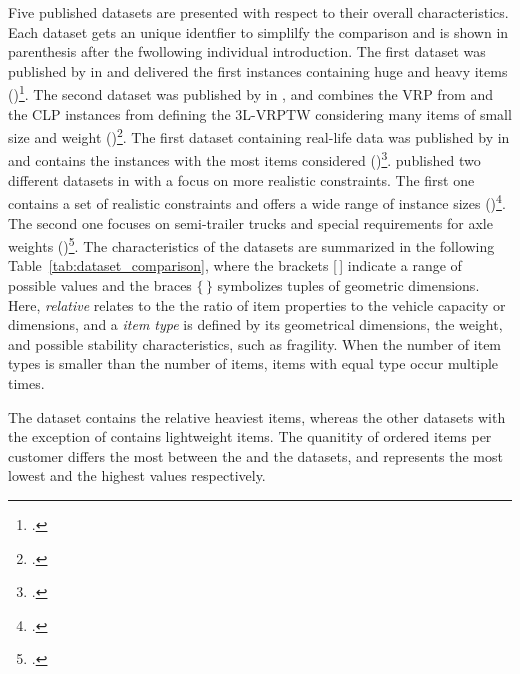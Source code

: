 Five published  datasets are presented with respect to their overall characteristics.
Each dataset gets an unique identfier to simplilfy the comparison and is shown in parenthesis
after the fwollowing individual introduction. The first  dataset was published by \citeauthor*{gendreau_tabu_2006} in
\citeyear{gendreau_tabu_2006} and delivered the first  instances containing huge and heavy items (\gendreauDataSet)\footcite[cf.][]{gendreau_tabu_2006}.
The second dataset was published by \citeauthor*{moura_integrated_2009} in \citeyear{moura_integrated_2009},
and combines the \gls{VRP} from \citeauthor*{solomon_algorithms_1987} and the \gls{CLP} instances from
\citeauthor*{bischoff_issues_1995} defining the \gls{3L-VRPTW} considering
many items of small size and weight (\mouraDataSet)\footcites[cf.][]{solomon_algorithms_1987,bischoff_issues_1995}[][]{moura_integrated_2009}.
The first dataset containing real-life data was published by \citeauthor*{ceschia_local_2013} in \citeyear{ceschia_local_2013}
and contains the instances with the most items considered (\ceschiaDataSet)\footcite[cf.][]{ceschia_local_2013}.
\citeauthor*{krebs_advanced_2021} published two different datasets in
\citeyear{krebs_advanced_2021} with a focus on more realistic constraints. The first one contains a set
of realistic constraints and offers a wide range of instance sizes (\krebsADataSet)\footcite[cf.][]{krebs_advanced_2021}.
The second one focuses on semi-trailer trucks and special requirements for axle weights (\krebsBDataSet)\footcite[cf.][]{krebs_axle_2021}.
The characteristics of the datasets are summarized in the following Table~\ref{tab:dataset_comparison},
where the brackets [\,] indicate a range of possible values and the braces $\{\,\}$ symbolizes tuples of geometric dimensions.
Here, \textit{relative} relates to the the ratio of item properties to the vehicle capacity or dimensions,
and a \textit{item type} is defined by its geometrical dimensions, the weight, and possible stability characteristics, such as fragility.
When the number of item types is smaller than the number of items, items with equal type occur multiple times.



The \gendreauDataSetText dataset contains the relative heaviest items, whereas the other datasets with the exception of
\krebsADataSetText contains lightweight items. The quanitity of ordered items per customer differs the most between
the \gendreauDataSetText and the \mouraDataSetText datasets, and represents the most lowest and the highest values
respectively.

